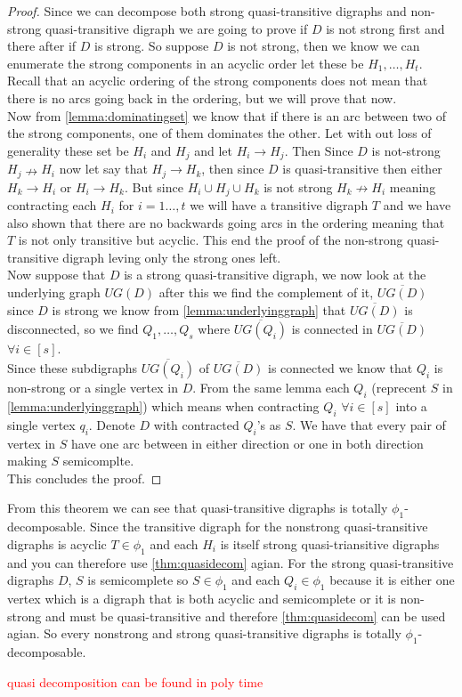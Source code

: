 \begin{proof}
    Since we can decompose both strong quasi-transitive digraphs and non-strong quasi-transitive digraph we are going to prove if $D$ is not strong first and there after if $D$ is strong.
    So suppose $D$ is not strong, then we know we can enumerate the strong components in an acyclic order let these be $H_1,\dots , H_t$. \\
    Recall that an acyclic ordering of the strong components does not mean that there is no arcs going back in the ordering, but we will prove that now. \\
    Now from \autoref{lemma:dominatingset} we know that if there is an arc between two of the strong components, one of them dominates the other.
    Let with out loss of generality these set be $H_i$ and $H_j$ and let $H_i\rightarrow H_j$. 
    Then Since $D$ is not-strong $H_j\nrightarrow H_i$ now let say that $H_j \rightarrow H_k$, then since $D$ is quasi-transitive then either $H_k\rightarrow H_i$ or $H_i \rightarrow H_k$. 
    But since $H_i\cup H_j \cup H_k$ is not strong $H_k\nrightarrow H_i$ meaning contracting each $H_i$ for $i=1\dots,t$ we will have a transitive digraph $T$ and we have also shown that there are no backwards going arcs in the ordering meaning that $T$ is not only transitive but acyclic. 
    This end the proof of the non-strong quasi-transitive digraph leving only the strong ones left.\\

    Now suppose that $D$ is a strong quasi-transitive digraph, we now look at the underlying graph $UG(D)$ after this we find the complement of it, $\overline{UG(D)}$ since $D$ is strong we know from \autoref{lemma:underlyinggraph} that $\overline{UG(D)}$ is disconnected, so we find $Q_1,\dots , Q_s$ where $\overline{UG(Q_i)}$ is connected in $\overline{UG(D)}$ $\forall i \in [s]$.\\ 
    Since these subdigraphs $\overline{UG(Q_i)}$ of $\overline{UG(D)}$ is connected we know that $Q_i$ is non-strong or a single vertex in $D$. 
    From the same lemma each $Q_i$ (reprecent $S$ in \autoref{lemma:underlyinggraph}) which means when contracting $Q_i$ $\forall i\in [s]$ into a single vertex $q_i$. 
    Denote $D$ with contracted $Q_i$'s as $S$. 
    We have that every pair of vertex in $S$ have one arc between in either direction or one in both direction making $S$ semicomplte. \\
    This concludes the proof.
\end{proof}
From this theorem we can see that quasi-transitive digraphs is totally $\phi_1$-decomposable. 
Since the transitive digraph for the nonstrong quasi-transitive digraphs is acyclic $T\in \phi_1$ and each $H_i$ is itself strong quasi-triansitive digraphs and you can therefore use \autoref{thm:quasidecom} agian.  
For the strong quasi-transitive digraphs $D$, $S$ is semicomplete so $S\in \phi_1$ and each $Q_i \in \phi_1$ because it is either one vertex which is a digraph that is both acyclic and semicomplete or it is non-strong and must be quasi-transitive and therefore \autoref{thm:quasidecom} can be used agian. So every nonstrong and strong quasi-transitive digraphs is totally $\phi_1$-decomposable.

\begin{thm}
    \textcolor{red}{quasi decomposition can be found in poly time}
\end{thm}
